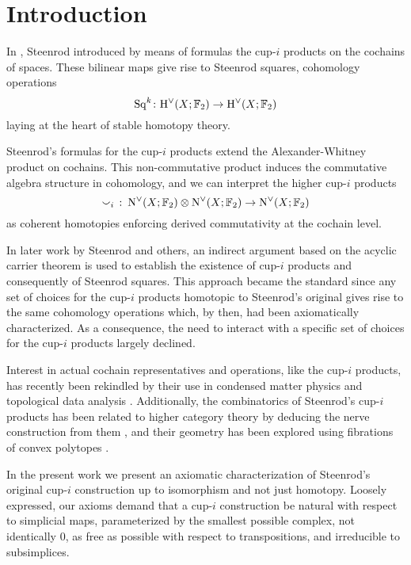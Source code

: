 
\section{Introduction} \label{s:introduction}

In \cite{steenrod1947products}, Steenrod introduced by means of formulas the cup-$i$ products on the cochains of spaces.
These bilinear maps give rise to Steenrod squares, cohomology operations
\[
\mathrm{Sq}^k \colon \mathrm{H}^\vee(X; {\mathbb{F}_2}) \to \mathrm{H}^\vee(X; {\mathbb{F}_2})
\]
laying at the heart of stable homotopy theory.

Steenrod's formulas for the cup-$i$ products extend the Alexander-Whitney product on cochains.
This non-commutative product induces the commutative algebra structure in cohomology, and we can interpret the higher cup-$i$ products
\[
\smallsmile_i\ \colon \operatorname{N^{\vee}}(X; {\mathbb{F}_2}) \otimes \operatorname{N^{\vee}}(X; {\mathbb{F}_2}) \to \operatorname{N^{\vee}}(X; {\mathbb{F}_2})
\]
as coherent homotopies enforcing derived commutativity at the cochain level.

In later work by Steenrod \cite{steenrod1962cohomology} and others, an indirect argument based on the acyclic carrier theorem is used to establish the existence of cup-$i$ products and consequently of Steenrod squares.
This approach became the standard since any set of choices for the cup-$i$ products homotopic to Steenrod's original gives rise to the same cohomology operations which, by then, had been axiomatically characterized.
As a consequence, the need to interact with a specific set of choices for the cup-$i$ products largely declined.

Interest in actual cochain representatives and operations, like the \mbox{cup-$i$} products, has recently been rekindled by their use in condensed matter physics \cite{gaiotto2016spin, kapustin2017fermionic, barkeshli2021classification} and topological data analysis \cite{medina2018persistence}.
Additionally, the combinatorics of Steenrod's cup-$i$ products has been related to higher category theory by deducing the nerve construction from them \cite{street1987orientals, medina2020globular}, and their geometry has been explored using fibrations of convex polytopes \cite{medina2022fib_poly}.

In the present work we present an axiomatic characterization of Steenrod's original cup-$i$ construction up to isomorphism and not just homotopy.
Loosely expressed, our axioms demand that a cup-$i$ construction be natural with respect to simplicial maps, parameterized by the smallest possible complex, not identically $0$, as free as possible with respect to transpositions, and irreducible to subsimplices.

